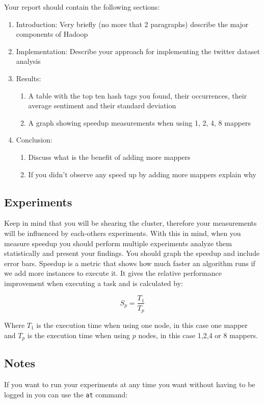 \documentclass[a4paper,10pt]{article}
\begin{document}
Your report should contain the following sections:

\begin{enumerate}
 \item Introduction: Very briefly (no more that 2 paragraphs) describe the major components of Hadoop
 \item Implementation: Describe your approach for implementing the twitter dataset analysis 
 \item Results: 
 \begin{enumerate}
  \item A table with the top ten hash tags you found, their occurrences, their average sentiment and their standard deviation
  \item A graph showing speedup measurements when using 1, 2, 4, 8 mappers
 \end{enumerate}
 \item Conclusion: 
  \begin{enumerate}
  \item Discuss what is the benefit of adding more mappers
  \item If you didn't observe any speed up by adding more mappers explain why
  \end{enumerate}

\end{enumerate}


\subsection{Experiments}
Keep in mind that you will be shearing the cluster, therefore your measurements will be influenced by each-others experiments. 
With this in mind, when you measure speedup you should perform multiple experiments analyze them statistically and present your findings. 
You should graph the speedup and include error bars. Speedup is a metric that shows how much faster an algorithm runs if we add more instances to execute it. It gives the relative performance improvement when executing a task and is calculated by: 

\[
 S_p = \frac{T_1}{T_p}
\]

Where $T_1$ is the execution time when using one node, in this case one mapper and $T_p$ is the execution time when using $p$ nodes, in this case 1,2,4 or 8 mappers.

\subsection{Notes}
If you want to run your experiments at any time you want without having to be logged in you can use the \texttt{at} command:
\end{document}
